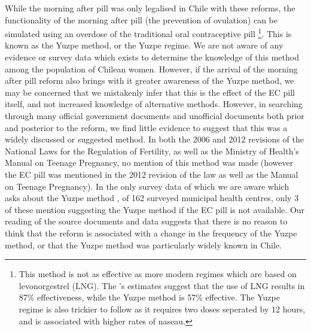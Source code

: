 \documentclass[11pt,subeqn]{article}
\begin{document}
\begin{spacing}{1.4}
While the morning after pill was only legalised in Chile with these reforms,
the functionality of the morning after pill (the prevention of ovulation) can
be simulated using an overdose of the traditional oral contraceptive pill 
\citep{TaskForce1998}\footnote{This method is not as effective as more 
modern regimes which are based on levonorgestrel (LNG). The 
\citeauthor{TaskForce1998}'s estimates suggest that the use of LNG results in
87\% effectiveness, while the Yuzpe method is 57\% effective. The Yuzpe regime
is also trickier to follow as it requires two doses seperated by 12 hours, and
is associated with higher rates of naseau.}. This is known as the Yuzpe method, 
or the Yuzpe regime. We are not aware of any evidence or survey data which exists 
to determine the knowledge of this method among the population of Chilean women.  
However, if the arrival of the morning after pill reform also brings with it 
greater awareness of the Yuzpe method, we may be concerned that we mistakenly 
infer that this is the effect of the EC pill itself, and not increased knowledge 
of alternative methods.  However, in searching through many official government 
documents and unofficial documents both prior and posterior to the reform, we 
find little evidence to suggest that this was a widely discussed or suggested 
method.  In both the 2006 and 2012 revisions of the National Laws for the 
Regulation of Fertility, as well as the Ministry of Health's Manual on Teenage 
Pregnancy, no mention of this method was made (however the EC pill was mentioned 
in the 2012 revision of the law as well as the Manual on Teenage Pregnancy). In 
the only survey data of which we are aware which asks about the Yuzpe method 
\citep{Didesetal2010}, of 162 surveyed municipal health centres, only 3 of 
these mention suggesting the Yuzpe method if the EC pill is not available.  Our 
reading of the source documents and data suggests that there is no reason to 
think that the reform is associated with a change in the frequency of the Yuzpe 
method, or that the Yuzpe method was particularly widely known in Chile.


\end{spacing}
\end{document}
